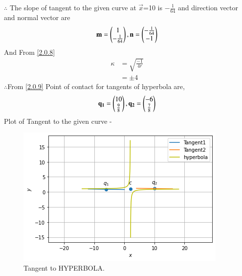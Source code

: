 \documentclass[journal,12pt,twocolumn]{IEEEtran}
\begin{document}
$\therefore$  The slope of tangent to the given curve at $\vec{x}$=10 is
$-\frac{1}{64}$ and direction vector and normal vector are
\begin{align}
\mathbf{m}=\begin{pmatrix}1\\-\frac{1}{64}\end{pmatrix},\mathbf{n}=\begin{pmatrix}-\frac{1}{64}\\-1\end{pmatrix}
\end{align}
And From \eqref{2.0.8}
\begin{align}
\kappa &= \sqrt{\frac{-1}{4r}} \\
&=\pm 4
\end{align}
$\therefore$From \eqref{2.0.9} Point of contact for tangents of hyperbola are,
\begin{align}
  \mathbf{q_1}=\begin{pmatrix}10\\\frac{9}{8}\end{pmatrix},\mathbf{q_2}=\begin{pmatrix}-6\\\frac{7}{8}\end{pmatrix}
\end{align}
Plot of Tangent to the given curve -
\begin{figure}[!ht]
    \centering
    \includegraphics[width=\columnwidth]{HYPERBOLA.png}
    \caption{Tangent to HYPERBOLA.}
    \label{fig:Tangent to HYPERBOLA.}
\end{figure}  
\end{document}
